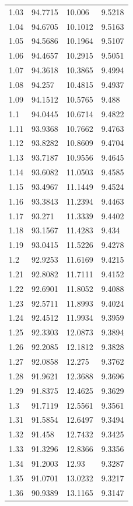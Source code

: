 \begin{tabular}{llll}
1.03 & 94.7715 & 10.006 & 9.5218 \\
1.04 & 94.6705 & 10.1012 & 9.5163 \\
1.05 & 94.5686 & 10.1964 & 9.5107 \\
1.06 & 94.4657 & 10.2915 & 9.5051 \\
1.07 & 94.3618 & 10.3865 & 9.4994 \\
1.08 & 94.257 & 10.4815 & 9.4937 \\
1.09 & 94.1512 & 10.5765 & 9.488 \\
1.1 & 94.0445 & 10.6714 & 9.4822 \\
1.11 & 93.9368 & 10.7662 & 9.4763 \\
1.12 & 93.8282 & 10.8609 & 9.4704 \\
1.13 & 93.7187 & 10.9556 & 9.4645 \\
1.14 & 93.6082 & 11.0503 & 9.4585 \\
1.15 & 93.4967 & 11.1449 & 9.4524 \\
1.16 & 93.3843 & 11.2394 & 9.4463 \\
1.17 & 93.271 & 11.3339 & 9.4402 \\
1.18 & 93.1567 & 11.4283 & 9.434 \\
1.19 & 93.0415 & 11.5226 & 9.4278 \\
1.2 & 92.9253 & 11.6169 & 9.4215 \\
1.21 & 92.8082 & 11.7111 & 9.4152 \\
1.22 & 92.6901 & 11.8052 & 9.4088 \\
1.23 & 92.5711 & 11.8993 & 9.4024 \\
1.24 & 92.4512 & 11.9934 & 9.3959 \\
1.25 & 92.3303 & 12.0873 & 9.3894 \\
1.26 & 92.2085 & 12.1812 & 9.3828 \\
1.27 & 92.0858 & 12.275 & 9.3762 \\
1.28 & 91.9621 & 12.3688 & 9.3696 \\
1.29 & 91.8375 & 12.4625 & 9.3629 \\
1.3 & 91.7119 & 12.5561 & 9.3561 \\
1.31 & 91.5854 & 12.6497 & 9.3494 \\
1.32 & 91.458 & 12.7432 & 9.3425 \\
1.33 & 91.3296 & 12.8366 & 9.3356 \\
1.34 & 91.2003 & 12.93 & 9.3287 \\
1.35 & 91.0701 & 13.0232 & 9.3217 \\
1.36 & 90.9389 & 13.1165 & 9.3147 \\

\end{tabular}
